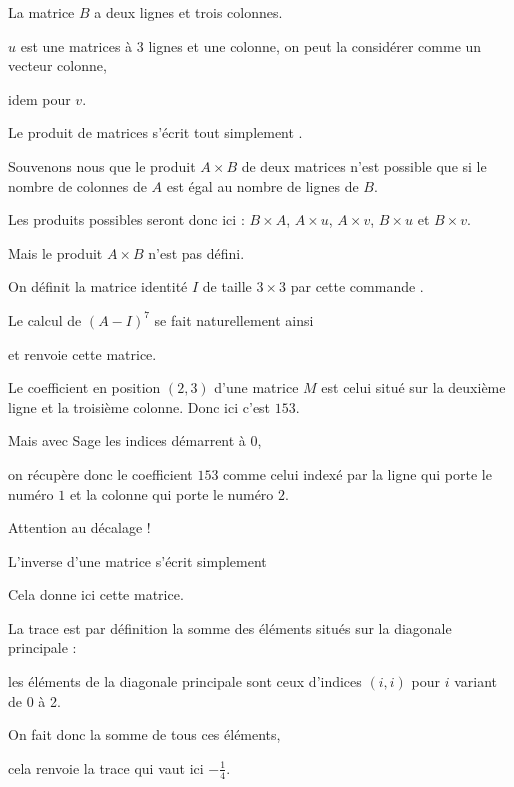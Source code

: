 La matrice $B$ a deux lignes et trois colonnes.

$u$ est une matrices à $3$ lignes et une colonne, on peut la considérer comme un vecteur colonne,

idem pour $v$.


\change
Le produit de matrices s'écrit tout simplement .

\change
Souvenons nous que le produit $A \times B$ de deux matrices 
n'est possible que si le nombre de colonnes de $A$ est égal au nombre de lignes de $B$.

\change
  Les produits possibles seront donc ici : 
  $B\times A$, $A \times u$, $A \times v$,  $B \times u$ et $B \times v$.
  
  Mais le produit $A \times B$ n'est pas défini.

\diapo

On définit la matrice identité $I$ de taille $3\times 3$ par cette
 commande .


\change

Le calcul de $(A-I)^{7}$ se fait naturellement ainsi


\change
et renvoie cette matrice.


\change  
Le coefficient en position $(2,3)$ d'une matrice $M$ 
  est celui situé sur la deuxième ligne et la troisième colonne.
  Donc ici c'est $153$.  
  
Mais avec Sage les indices démarrent à $0$,

on récupère donc le coefficient $153$ comme celui indexé
par la ligne qui porte le numéro $1$ et la colonne qui porte le numéro $2$.
 
Attention au décalage !
  
\change
L'inverse d'une matrice    s'écrit simplement
  
\change
Cela donne ici cette matrice.

\change
La trace est par définition la somme des éléments situés sur la diagonale principale : 

\change
les éléments de la diagonale principale sont ceux d'indices $(i,i)$ pour $i$ variant de 0 à 2.


On fait donc la somme de tous ces éléments,

\change
cela renvoie la trace qui vaut ici $-\frac14$.


\diapo

